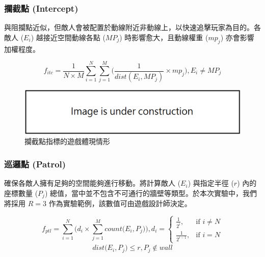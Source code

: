 \subsubsection{攔截點 (Intercept)}
\label{sssec:method-segments-fitnesses-intercept}

與阻攔點近似，但敵人會被配置於動線附近非動線上，以快速追擊玩家為目的。各敵人 ($E_{i}$) 越接近空間動線各點 ($MP_{j}$) 時影響愈大，且動線權重 ($mp_{j}$) 亦會影響加權程度。

\begin{equation}
    f_{itc} = \frac{1}{N \times M} \sum_{i=1}^{N} \sum_{j=1}^{M} \Big( \frac{1}{dist(E_{i}, MP_{j})} \times mp_{j} \Big), 
    E_{i} \neq MP_{j}
\end{equation}

\begin{figure}[ht]
  \begin{center}
    \includegraphics[width=1.0\textwidth]{figures/under_construction.png}
    \caption{攔截點指標的遊戲體現情形}
    \label{fig:fitnesses-intercept-gameplay}
  \end{center}
\end{figure}

\subsubsection{巡邏點 (Patrol)}
\label{sssec:method-segments-fitnesses-patrol}

確保各敵人擁有足夠的空間能夠進行移動。將計算敵人 ($E_{i}$) 與指定半徑 ($r$) 內的座標數量 ($P_j$) 總值，當中並不包含不可通行的牆壁等類型。於本次實驗中，我們將採用 $R=3$ 作為實驗範例，該數值可由遊戲設計師決定。

\begin{equation}
    f_{ptl} = \sum_{i=1}^{N} \Big( d_{i} \times \sum_{j=1}^{M} count\big(E_{i}, P_{j}\big) \Big), 
    d_{i} = \begin{cases}
                \frac{1}{2^{i}},   & \mbox{if } i \neq N \\
                \frac{1}{2^{i-1}}, & \mbox{if } i = N
            \end{cases}
\end{equation}
\begin{gather*}
    dist\big(E_{i}, P_{j}\big) \leq r,  P_{j} \notin wall
\end{gather*}

